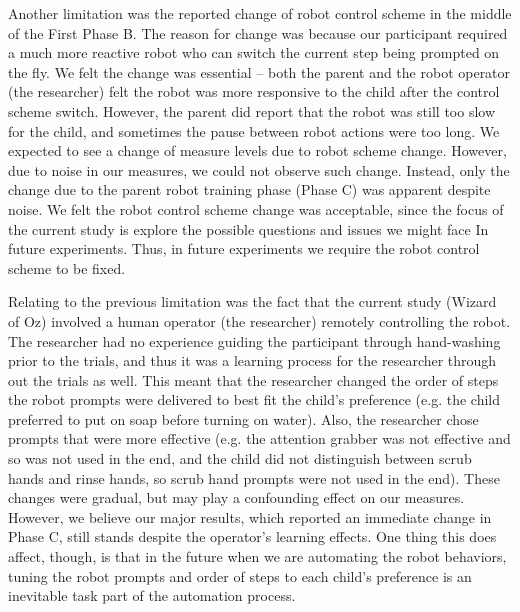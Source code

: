 Another limitation was the reported change of robot control scheme in the middle of the First Phase B.  The reason for change was because our participant required a much more reactive robot who can switch the current step being prompted on the fly.  We felt the change was essential -- both the parent and the robot operator (the researcher) felt the robot was more responsive to the child after the control scheme switch.  However, the parent did report that the robot was still too slow for the child, and sometimes the pause between robot actions were too long.  We expected to see a change of measure levels due to robot scheme change.  However, due to noise in our measures, we could not observe such change.  Instead, only the change due to the parent robot training phase (Phase C) was apparent despite noise.  We felt the robot control scheme change was acceptable, since the focus of the current study is explore the possible questions and issues we might face In future experiments.  Thus, in future experiments we require the robot control scheme to be fixed.

Relating to the previous limitation was the fact that the current study (Wizard of Oz) involved a human operator (the researcher) remotely controlling the robot.  The researcher had no experience guiding the participant through hand-washing prior to the trials, and thus it was a learning process for the researcher through out the trials as well.  This meant that the researcher changed the order of steps the robot prompts were delivered to best fit the child's preference (e.g. the child preferred to put on soap before turning on water).  Also, the researcher chose prompts that were more effective (e.g. the attention grabber was not effective and so was not used in the end, and the child did not distinguish between scrub hands and rinse hands, so scrub hand prompts were not used in the end).  These changes were gradual, but may play a confounding effect on our measures.  However, we believe our major results, which reported an immediate change in Phase C, still stands despite the operator's learning effects.  One thing this does affect, though, is that in the future when we are automating the robot behaviors, tuning the robot prompts and order of steps to each child's preference is an inevitable task part of the automation process.

